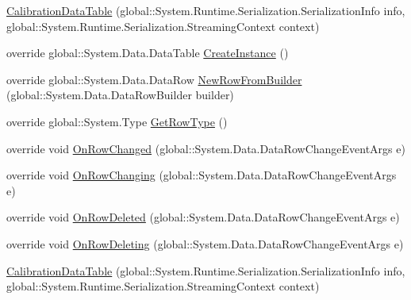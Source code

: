 \begin{DoxyCompactItemize}
\item 
\hyperlink{class_env_int_1_1_win32_1_1_field_tech_1_1_manager_1_1_data_sets_1_1_guide_ware_mobile_data_set_1_1_calibration_data_table_aee73c937e823abfecd360abe5628a1f6}{Calibration\+Data\+Table} (global\+::\+System.\+Runtime.\+Serialization.\+Serialization\+Info info, global\+::\+System.\+Runtime.\+Serialization.\+Streaming\+Context context)
\item 
override global\+::\+System.\+Data.\+Data\+Table \hyperlink{class_env_int_1_1_win32_1_1_field_tech_1_1_manager_1_1_data_sets_1_1_guide_ware_mobile_data_set_1_1_calibration_data_table_a2c941f5945959302f3eb4aafe6758c40}{Create\+Instance} ()
\item 
override global\+::\+System.\+Data.\+Data\+Row \hyperlink{class_env_int_1_1_win32_1_1_field_tech_1_1_manager_1_1_data_sets_1_1_guide_ware_mobile_data_set_1_1_calibration_data_table_adcb904b6ae18c9827955d75fa0619298}{New\+Row\+From\+Builder} (global\+::\+System.\+Data.\+Data\+Row\+Builder builder)
\item 
override global\+::\+System.\+Type \hyperlink{class_env_int_1_1_win32_1_1_field_tech_1_1_manager_1_1_data_sets_1_1_guide_ware_mobile_data_set_1_1_calibration_data_table_a02c09718810a0fd3793639bb7c8a7c57}{Get\+Row\+Type} ()
\item 
override void \hyperlink{class_env_int_1_1_win32_1_1_field_tech_1_1_manager_1_1_data_sets_1_1_guide_ware_mobile_data_set_1_1_calibration_data_table_a3186e701b3970cd5966f60b3cd54180f}{On\+Row\+Changed} (global\+::\+System.\+Data.\+Data\+Row\+Change\+Event\+Args e)
\item 
override void \hyperlink{class_env_int_1_1_win32_1_1_field_tech_1_1_manager_1_1_data_sets_1_1_guide_ware_mobile_data_set_1_1_calibration_data_table_af20aa02f6895ae82c8bdff853c0b6d45}{On\+Row\+Changing} (global\+::\+System.\+Data.\+Data\+Row\+Change\+Event\+Args e)
\item 
override void \hyperlink{class_env_int_1_1_win32_1_1_field_tech_1_1_manager_1_1_data_sets_1_1_guide_ware_mobile_data_set_1_1_calibration_data_table_ae3dceb58016dd7b4a361cc0b22d07048}{On\+Row\+Deleted} (global\+::\+System.\+Data.\+Data\+Row\+Change\+Event\+Args e)
\item 
override void \hyperlink{class_env_int_1_1_win32_1_1_field_tech_1_1_manager_1_1_data_sets_1_1_guide_ware_mobile_data_set_1_1_calibration_data_table_a6d00f3f72f3520fbd758eac9a1ec1e8b}{On\+Row\+Deleting} (global\+::\+System.\+Data.\+Data\+Row\+Change\+Event\+Args e)
\item 
\hyperlink{class_env_int_1_1_win32_1_1_field_tech_1_1_manager_1_1_data_sets_1_1_guide_ware_mobile_data_set_1_1_calibration_data_table_aee73c937e823abfecd360abe5628a1f6}{Calibration\+Data\+Table} (global\+::\+System.\+Runtime.\+Serialization.\+Serialization\+Info info, global\+::\+System.\+Runtime.\+Serialization.\+Streaming\+Context context)

\end{DoxyCompactItemize}
